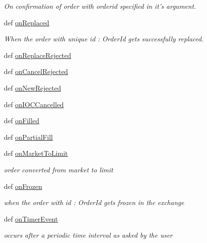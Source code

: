 \begin{DoxyCompactItemize}
\begin{DoxyCompactList}\small\item\em On confirmation of order with orderid specified in it's argument. \item\end{DoxyCompactList}\item 
def \hyperlink{classsampleStrategy_1_1sample_a796c72e272e1fa82e689b587cf7f7ab5}{onReplaced}
\begin{DoxyCompactList}\small\item\em When the order with unique id : OrderId gets successfully replaced. \item\end{DoxyCompactList}\item 
def \hyperlink{classsampleStrategy_1_1sample_a66bfb1076effa11ba4cb0f50e7252290}{onReplaceRejected}
\item 
def \hyperlink{classsampleStrategy_1_1sample_ac7e089095ad3d2c32e459776fc188e65}{onCancelRejected}
\item 
def \hyperlink{classsampleStrategy_1_1sample_acb840933b56f5e6f81c04ea71d18d189}{onNewRejected}
\item 
def \hyperlink{classsampleStrategy_1_1sample_a6f7c61fc31347e89aa9a0e5b130abc9d}{onIOCCancelled}
\item 
def \hyperlink{classsampleStrategy_1_1sample_ac4878fc8589f35e622c2b31b79691c84}{onFilled}
\item 
def \hyperlink{classsampleStrategy_1_1sample_a222fca1c338ee3514e9e74d640721898}{onPartialFill}
\item 
def \hyperlink{classsampleStrategy_1_1sample_a0dadfb1a2a74b910362bfeb1d5564185}{onMarketToLimit}
\begin{DoxyCompactList}\small\item\em order converted from market to limit \item\end{DoxyCompactList}\item 
def \hyperlink{classsampleStrategy_1_1sample_af7a376b4e20ecd8bc87e339f53b8f932}{onFrozen}
\begin{DoxyCompactList}\small\item\em when the order with id : OrderId gets frozen in the exchange \item\end{DoxyCompactList}\item 
def \hyperlink{classsampleStrategy_1_1sample_a4cee019e70ecc59d7c8f6d3332674e3b}{onTimerEvent}
\begin{DoxyCompactList}\small\item\em occurs after a periodic time interval as asked by the user \item\end{DoxyCompactList}\end{DoxyCompactItemize}
